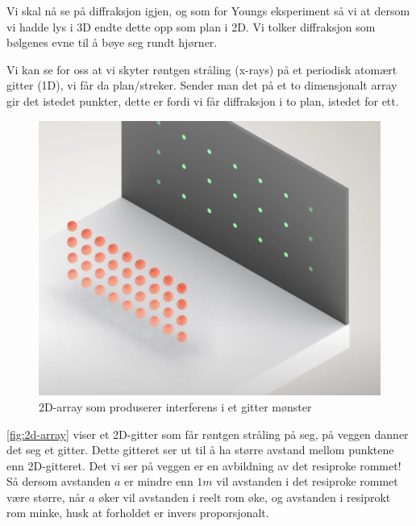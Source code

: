 
Vi skal nå se på diffraksjon igjen, og som for Youngs eksperiment så vi at dersom vi hadde lys i 3D endte dette opp som plan i 2D. Vi tolker diffraksjon som bølgenes evne til å bøye seg rundt hjørner. 

Vi kan se for oss at vi skyter røntgen stråling (x-rays) på et periodisk atomært gitter (1D), vi får da plan/streker. Sender man det på et to dimensjonalt array gir det istedet punkter, dette er fordi vi får diffraksjon i to plan, istedet for ett.

\begin{figure}[!htb]
    \centering
    \includegraphics[scale=0.45]{Bilder/SamtaleTema4/2D-array.png}
    \caption{2D-array som produserer interferens i et gitter mønster}
    \label{fig:2d-array}
\end{figure}

\autoref{fig:2d-array} viser et 2D-gitter som får røntgen stråling på seg, på veggen danner det seg et gitter. Dette gitteret ser ut til å ha større avstand mellom punktene enn 2D-gitteret. Det vi ser på veggen er en avbildning av det resiproke rommet! Så dersom avstanden $a$ er mindre enn $1m$ vil avstanden i det resiproke rommet være større, når $a$ øker vil avstanden i reelt rom øke, og avstanden i resiprokt rom minke, husk at forholdet er invers proporsjonalt.

